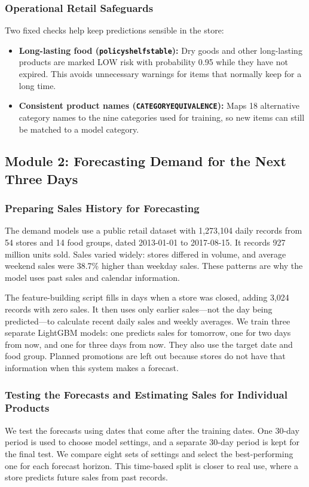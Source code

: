 \documentclass[12pt,a4paper]{article}
\renewcommand{\_}{\oldunderscore\allowbreak}
\begin{document}
\subsubsection{Operational Retail Safeguards}
Two fixed checks help keep predictions sensible in the store:
\begin{itemize}[leftmargin=18pt, itemsep=2pt]
    \item \textbf{Long-lasting food (\texttt{policy\_shelf\_stable}):} Dry goods and other long-lasting products are marked LOW risk with probability 0.95 while they have not expired. This avoids unnecessary warnings for items that normally keep for a long time.
    \item \textbf{Consistent product names (\texttt{CATEGORY\_EQUIVALENCE}):} Maps 18 alternative category names to the nine categories used for training, so new items can still be matched to a model category.
\end{itemize}

\subsection{Module 2: Forecasting Demand for the Next Three Days}
\label{sec:forecast_method}

\subsubsection{Preparing Sales History for Forecasting}
The demand models use a public retail dataset with 1,273,104 daily records from 54 stores and 14 food groups, dated 2013-01-01 to 2017-08-15. It records 927 million units sold. Sales varied widely: stores differed in volume, and average weekend sales were 38.7\% higher than weekday sales. These patterns are why the model uses past sales and calendar information.

The feature-building script fills in days when a store was closed, adding 3,024 records with zero sales. It then uses only earlier sales—not the day being predicted—to calculate recent daily sales and weekly averages. We train three separate LightGBM models: one predicts sales for tomorrow, one for two days from now, and one for three days from now. They also use the target date and food group. Planned promotions are left out because stores do not have that information when this system makes a forecast.

\subsubsection{Testing the Forecasts and Estimating Sales for Individual Products}
We test the forecasts using dates that come after the training dates. One 30-day period is used to choose model settings, and a separate 30-day period is kept for the final test. We compare eight sets of settings and select the best-performing one for each forecast horizon. This time-based split is closer to real use, where a store predicts future sales from past records.
\end{document}
